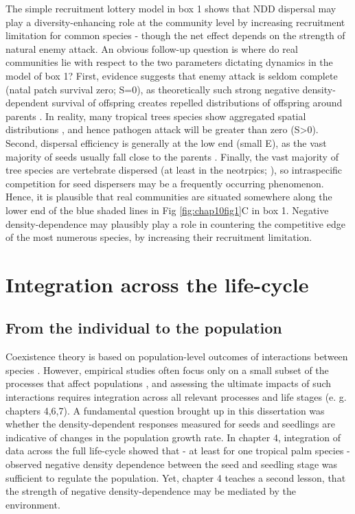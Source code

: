 \documentclass[b5paper,justified]{tufte-book} %
\begin{document}
\begin{fullwidth}
\hspace{.5cm} The simple recruitment lottery model in box 1 shows that NDD dispersal may play a diversity-enhancing role at the community level by increasing recruitment limitation for common species - though the net effect depends on the strength of natural enemy attack. An obvious follow-up question is where do real communities lie with respect to the two parameters dictating dynamics in the model of box 1? First, evidence suggests that enemy attack is seldom complete (natal patch survival zero; S=$0$), as theoretically such strong negative density-dependent survival of offspring creates repelled distributions of offspring around parents \citep{Bagchi2010}. In reality, many tropical trees species show aggregated spatial distributions \citep{Condit1992, Condit2000}, and hence pathogen attack will be greater than zero (S>0). Second, dispersal efficiency is generally at the low end (small E), as the vast majority of seeds usually fall close to the parents \citep{Clark2005, Muller-Landau2008, Putten2012}. Finally, the vast majority of tree species are vertebrate dispersed (at least in the neotrpics; \citealt{Howe1982}), so intraspecific competition for seed dispersers may be a frequently occurring phenomenon. Hence, it is plausible that real communities are situated somewhere along the lower end of the blue shaded lines in Fig \ref{fig:chap10fig1}C in box 1. Negative density-dependence may plausibly play a role in countering the competitive edge of the most numerous species, by increasing their recruitment limitation.

\section{Integration across the life-cycle}

\subsection{From the individual to the population} 
Coexistence theory is based on population-level outcomes of interactions between species \citep{Chesson2000, Adler2007}. However, empirical studies often focus only on a small subset of the processes that affect populations \citep{Metcalf2007}, and assessing the ultimate impacts of such interactions requires integration across all relevant processes and life stages (e. g. chapters 4,6,7). A fundamental question brought up in this dissertation was whether the density-dependent responses measured for seeds and seedlings \citep{Harms2000a, Comita2010} are indicative of changes in the population growth rate. In chapter 4, integration of data across the full life-cycle showed that - at least for one tropical palm species - observed negative density dependence between the seed and seedling stage was sufficient to regulate the population. Yet, chapter 4 teaches a second lesson, that the strength of negative density-dependence may be mediated by the environment.


\end{fullwidth}
\end{document}
